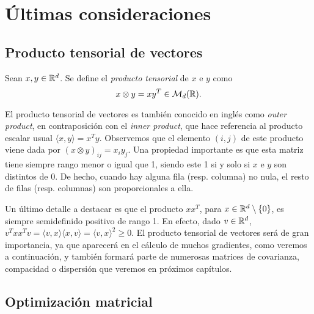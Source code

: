 \section{Últimas consideraciones}

\subsection{Producto tensorial de vectores}

\begin{definition}
    Sean $x,y \in \mathbb{R}^d$. Se define el \emph{producto tensorial} de $x$ e $y$ como
    \[ x \otimes y = xy^T \in \mathcal{M}_d(\mathbb{R}). \]
\end{definition}

El producto tensorial de vectores es también conocido en inglés como \emph{outer product}, en contraposición con el \emph{inner product}, que hace referencia al producto escalar usual $\langle x, y \rangle = x^Ty$. Observemos que el elemento $(i,j)$ de este producto viene dada por $(x \otimes y)_{ij} = x_iy_j$. Una propiedad importante es que esta matriz tiene siempre rango menor o igual que 1, siendo este 1 si y solo si $x$ e $y$ son distintos de 0. De hecho, cuando hay alguna fila (resp. columna) no nula, el resto de filas (resp. columnas) son proporcionales a ella.

Un último detalle a destacar es que el producto $xx^T$, para $x \in \mathbb{R}^{d}\setminus \{0\}$, es siempre semidefinido positivo de rango 1. En efecto, dado $v \in \mathbb{R}^d$, $v^Txx^Tv = \langle v,x \rangle\langle x,v \rangle = \langle v,x \rangle^2 \ge 0$. El producto tensorial de vectores será de gran importancia, ya que aparecerá en el cálculo de muchos gradientes, como veremos a continuación, y también formará parte de numerosas matrices de covarianza, compacidad o dispersión que veremos en próximos capítulos.

\subsection{Optimización matricial}

